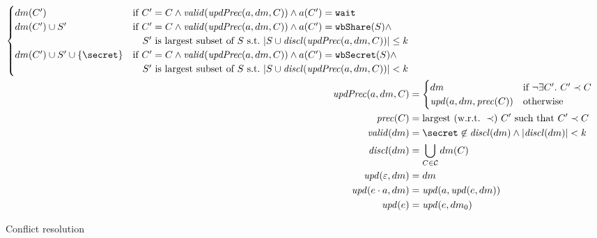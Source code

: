 \begin{figure*}
\begin{align*}
\begin{cases}
 		dm(C') &  \text{if}\ C' = C \wedge \valid{\updPrec{a}{dm}{C}} \wedge a(C') = \wait \\
 		dm(C') \cup S' &  \text{if}\ C' = C \wedge \valid{\updPrec{a}{dm}{C}} \wedge a(C') = \wShare{S} \wedge \\
 			& \quad S'\ \text{is largest subset of}\ S\ \text{s.t.}\ |S \cup \disclosed{\updPrec{a}{dm}{C}}| \leq k \\
 		dm(C') \cup S' \cup \{\secret\} &  \text{if}\ C' = C \wedge \valid{\updPrec{a}{dm}{C}} \wedge a(C') = \wSecret{S} \wedge \\
 			& \quad S'\ \text{is largest subset of}\ S\ \text{s.t.}\ |S \cup \disclosed{\updPrec{a}{dm}{C}}| < k \\
	\end{cases}\\
	\updPrec{a}{dm}{C} &= 
	\begin{cases}
		dm & \text{if}\ \neg \exists C'.\ C' \prec C\\
		\partialUpdateDM{a}{dm}{\predecessor{C}}	 & \text{otherwise}
	\end{cases}
	\\
	\predecessor{C} &= \text{largest}\ (\text{w.r.t.}\ \prec)\ C'\ \text{such that}\ C' \prec C \\
	\valid{dm} &= \secret \not\in \disclosed{dm} \wedge |\disclosed{dm}| < k \\
	\disclosed{dm} &= \bigcup_{C \in \coalitionSchema} dm(C)\\
	\updateDM{\emptysequence}{dm} &= dm\\
	\updateDM{e \concat a}{dm} &= \updateDM{a}{\updateDM{e}{dm}}\\
	\update{e} &= \updateDM{e}{dm_0}
\end{align*}
\caption{Conflict resolution}\label{figure:conflict-resolution}
\end{figure*}


